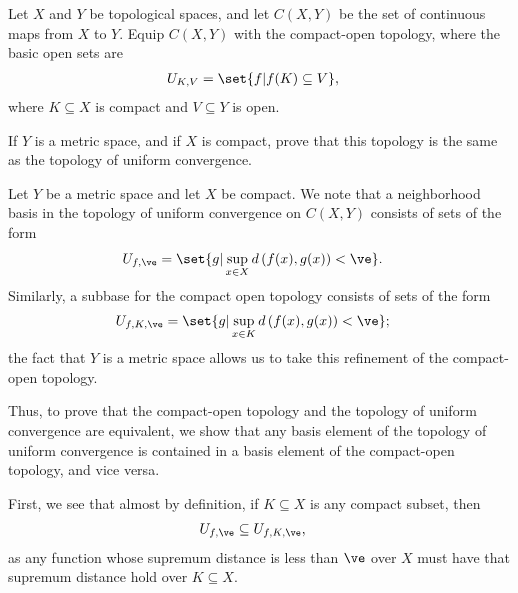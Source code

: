 \documentclass[10pt]{mypackage}
\begin{document}
\begin{problem}[Problem 7]
  Let $X$ and $Y$ be topological spaces, and let $C\left( X,Y \right)$ be the set of continuous maps from $X$ to $Y$. Equip $C\left( X,Y \right)$ with the compact-open topology, where the basic open sets are
  \begin{align*}
    U_{K,V} &= \set{f | f(K)\subseteq V},
  \end{align*}
  where $K\subseteq X$ is compact and $V\subseteq Y$ is open.\newline

  If $Y$ is a metric space, and if $X$ is compact, prove that this topology is the same as the topology of uniform convergence.
\end{problem}
\begin{solution}
  Let $Y$ be a metric space and let $X$ be compact. We note that a neighborhood basis in the topology of uniform convergence on $C\left( X,Y \right)$ consists of sets of the form
  \begin{align*}
    U_{f,\ve} &= \set{g | \sup_{x\in X}d\left( f(x),g(x) \right) < \ve}.
  \end{align*}
  Similarly, a subbase for the compact open topology consists of sets of the form
  \begin{align*}
    U_{f,K,\ve} &= \set{g | \sup_{x\in K}d\left( f(x),g(x) \right) < \ve};
  \end{align*}
  the fact that $Y$ is a metric space allows us to take this refinement of the compact-open topology.\newline

  Thus, to prove that the compact-open topology and the topology of uniform convergence are equivalent, we show that any basis element of the topology of uniform convergence is contained in a basis element of the compact-open topology, and vice versa.\newline

  First, we see that almost by definition, if $K\subseteq X$ is any compact subset, then
  \begin{align*}
    U_{f,\ve} &\subseteq U_{f,K,\ve},
  \end{align*}
  as any function whose supremum distance is less than $\ve$ over $X$ must have that supremum distance hold over $K\subseteq X$.\newline


\end{solution}
\end{document}
